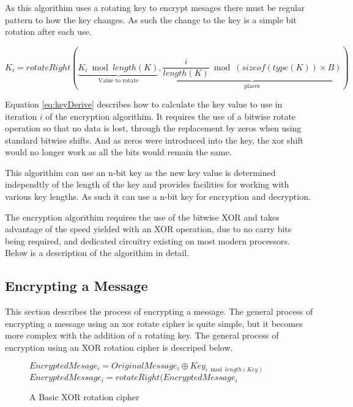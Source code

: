 \documentclass[12pt]{article}
\begin{document}
  As this algorithim uses a rotating key to encrypt mesages there
  must be regular pattern to how the key changes. As such the
  change to the key is a simple bit rotation after each use. 

  \begin{equation}
    \label{eq:keyDerive}
    K_i = rotateRight(
        \underbrace{K_i \bmod length(K)}_\text{Value to rotate},
        \underbrace{\frac{i}{length(K)} \bmod (sizeof(type(K)) 
            \times B)}_\text{places}) 
  \end{equation}

  Equation \eqref{eq:keyDerive} describes how to calculate the key value to use
  in iteration \( i \) of the encryption algorithim. It requires the use
  of a bitwise rotate operation so that no data is lost, through the
  replacement by zeros when using standard bitwise shifts. And as zeros
  were introduced into the key, the xor shift would no longer work as
  all the bits would remain the same.

  This algorithim can use an n-bit key as the new key value is
  determined independtly of the length of the key and provides
  facilities for working with various key lengths. As such it can use
  a n-bit key for encryption and decryption.

  The encryption algorithim requires the use of the bitwise XOR and
  takes advantage of the speed yielded with an XOR operation, due to
  no carry bits being required, and dedicated circuitry existing on most
  modern processors. Below is a description of the algorithim in detail.

  \subsection{Encrypting a Message}
    This section describes the process of encrypting a message.
    The general process of encrypting a message using an xor rotate
    cipher is quite simple, but it becomes more complex with the
    addition of a rotating key. The general process of encryption
    using an XOR rotation cipher is descriped below. 
    
    \begin{figure}[h]
    \begin{algorithmic}[1]
      \State $EncryptedMesage_i =
             OriginalMessage_i \oplus Key_{i \bmod length(Key)}$
      \State $EncryptedMessage_i = rotateRight(EncryptedMessage_i$
    \EndFor 
    \end{algorithmic}
    \caption{A Basic XOR rotation cipher}
    \end{figure}
\end{document}
